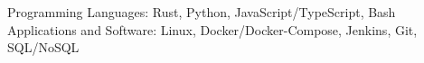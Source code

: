 
\begin{cvskills}
  \cvskill
    {Programming Languages:} %
    {Rust, Python, JavaScript/TypeScript, Bash} %
  \cvskill
    {Applications and Software:} %
    {Linux, Docker/Docker-Compose, Jenkins, Git, SQL/NoSQL} %
\end{cvskills}
